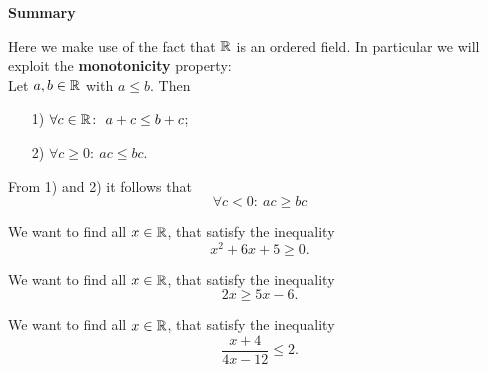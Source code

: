 \begin{frame} 
\textbf{Summary}
 \end{frame}

\begin{frame} 
Here we make use of the fact that ${\mathbb{R}}$ is an ordered field. In particular we will exploit the \textbf{monotonicity} property:\\[6pt]
Let $a,b\in {\mathbb{R}}$ with $a\leq b$. Then
\begin{itemize}
	\item[1)] $\forall c\in {\mathbb{R}}\colon ~ a+c\leq b+c$;
	\item[2)] $\forall c\geq 0\colon ~ ac\leq bc$.
\end{itemize}
From 1) and 2) it follows that
$$\forall c< 0\colon ~ ac\geq bc $$
 \end{frame}


\begin{frame} 
\begin{ex}
	We want to find all $x \in {\mathbb{R}}$, that satisfy the inequality $$x^2 + 6x + 5 \geq 0 .$$
\end{ex}
 \end{frame}



\begin{frame} 
\begin{ex}
	We want to find all $x \in {\mathbb{R}}$, that satisfy the inequality $$2x \geq 5x-6.$$
\end{ex}
 \end{frame}


\begin{frame} 
\begin{ex}
	We want to find all $x \in {\mathbb{R}}$, that satisfy the inequality $$\frac{x+4}{4x-12}  \leq 2.$$
\end{ex}
 \end{frame}

